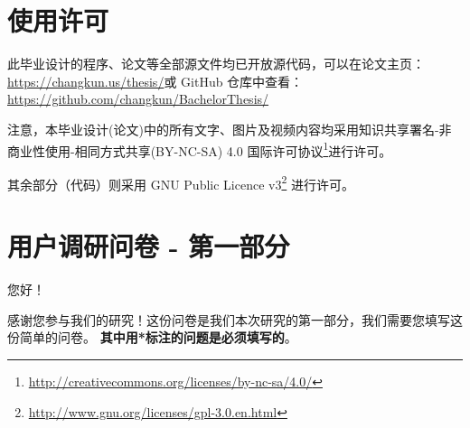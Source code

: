 
\appendix

  \chapter{使用许可}
  \label{appendix:a}

  此毕业设计的程序、论文等全部源文件均已开放源代码，可以在论文主页：\url{https://changkun.us/thesis/}或 GitHub 仓库中查看：\url{https://github.com/changkun/BachelorThesis/}

  注意，本毕业设计(论文)中的所有文字、图片及视频内容均采用知识共享署名-非商业性使用-相同方式共享(BY-NC-SA) 4.0 国际许可协议\footnote{\url{http://creativecommons.org/licenses/by-nc-sa/4.0/}}进行许可。

  其余部分（代码）则采用 GNU Public Licence v3\footnote{\url{http://www.gnu.org/licenses/gpl-3.0.en.html}} 进行许可。

  \cleardoublepage

  \chapter{用户调研问卷 - 第一部分}
  \label{appendix:b}

  您好！

  感谢您参与我们的研究！这份问卷是我们本次研究的第一部分，我们需要您填写这份简单的问卷。
  \textbf{其中用*标注的问题是必须填写的}。

